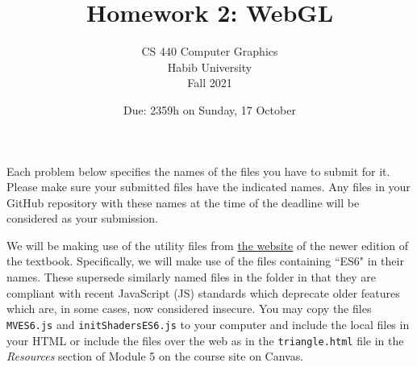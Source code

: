 \documentclass[addpoints]{exam}
\title{Homework 2: WebGL}
\author{CS 440 Computer Graphics\\Habib University\\Fall 2021}
\date{Due: 2359h on Sunday, 17 October}
\begin{document}
\maketitle

Each problem below specifies the names of the files you have to submit for it. Please make sure your submitted files have the indicated names. Any files in your GitHub repository with these names at the time of the deadline will be considered as your submission.

We will be making use of the utility files from \href{http://interactivecomputergraphics.com/8E/Code\%20update/Common/}{the website} of the newer edition of the textbook. Specifically, we will make use of the files containing ``ES6" in their names. These supersede similarly named files in the folder in that they are compliant with recent JavaScript (JS) standards which deprecate older features which are, in some cases, now considered insecure. You may copy the files \texttt{MVES6.js} and \texttt{initShadersES6.js} to your computer and include the local files in your HTML or include the files over the web as in the \texttt{triangle.html} file in the \textit{Resources} section of Module 5 on the course site on Canvas.
\end{document}

